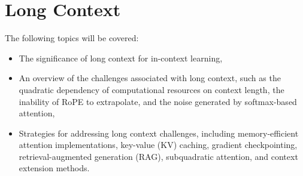 \chapter{Long Context}\label{chap:long-context}

The following topics will be covered:
\begin{itemize}
    \item The significance of long context for in-context learning,
    \item An overview of the challenges associated with long context, such as the quadratic dependency of computational resources on context length, the inability of RoPE to extrapolate, and the noise generated by softmax-based attention,
    \item Strategies for addressing long context challenges, including memory-efficient attention implementations, key-value (KV) caching, gradient checkpointing, retrieval-augmented generation (RAG), subquadratic attention, and context extension methods.
\end{itemize}
